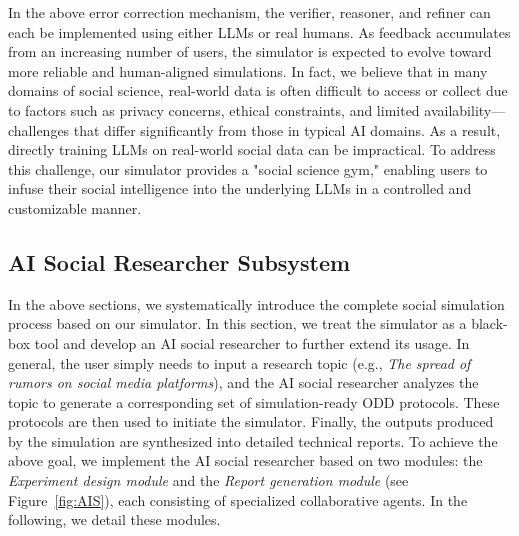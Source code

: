 \documentclass{article}
\theoremstyle{definition}
\theoremstyle{theorem}
\theoremstyle{proof}
\theoremstyle{remark}
\begin{document}
    In the above error correction mechanism, the verifier, reasoner, and refiner can each be implemented using either LLMs or real humans. As feedback accumulates from an increasing number of users, the simulator is expected to evolve toward more reliable and human-aligned simulations.
    In fact, we believe that in many domains of social science, real-world data is often difficult to access or collect due to factors such as privacy concerns, ethical constraints, and limited availability—challenges that differ significantly from those in typical AI domains. As a result, directly training LLMs on real-world social data can be impractical. To address this challenge, our simulator provides a "social science gym," enabling users to infuse their social intelligence into the underlying LLMs in a controlled and customizable manner.
    

    \subsection{AI Social Researcher Subsystem}
    In the above sections, we systematically introduce the complete social simulation process based on our simulator.
    In this section, we treat the simulator as a black-box tool and develop an AI social researcher to further extend its usage.
    In general, the user simply needs to input a research topic (e.g., {\emph{The spread of rumors on social media platforms}}), and the AI social researcher analyzes the topic to generate a corresponding set of simulation-ready ODD protocols. These protocols are then used to initiate the simulator. Finally, the outputs produced by the simulation are synthesized into detailed technical reports.
    To achieve the above goal, we implement the AI social researcher based on two modules: the \textit{Experiment design module} and the \textit{Report generation module} (see Figure~\ref{fig:AIS}), each consisting of specialized collaborative agents.
    In the following, we detail these modules.

\end{document}
